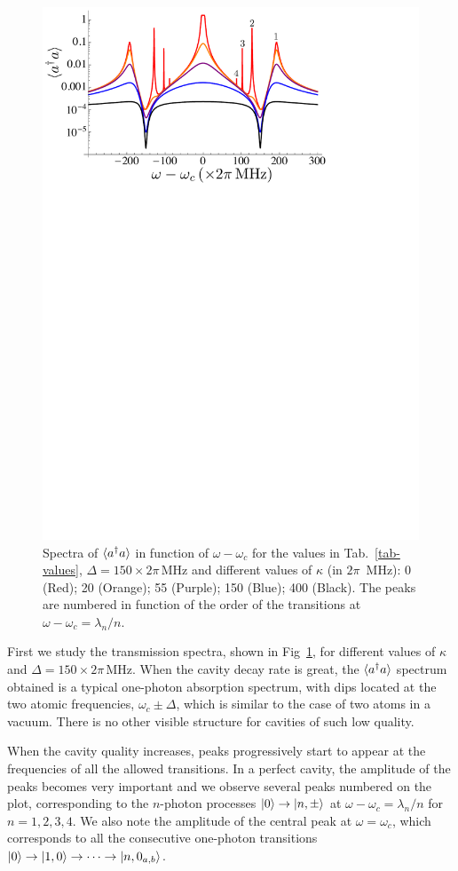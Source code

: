 \begin{figure}
\center
\includegraphics[width=0.75 \textwidth]{Images/chap5/aa_kappa.pdf}
\caption[ $\mean{a^\dagger a}$ in function of $\omega-\omega_c$]{ Spectra of $\mean{a^\dagger a}$ in function of $\omega-\omega_c$ for the values in Tab.~\ref{tab-values}, $\Delta=150 \times 2\pi\,\mbox{MHz}$ and different values of $\kappa$ (in $2\pi$~MHz): 0 (Red); 20 (Orange); 55 (Purple); 150 (Blue); 400 (Black). The peaks are numbered in function of the order of the transitions at $\omega-\omega_c=\lambda_n/n$.}
\label{fig-aa_kappa}
\end{figure}

First we study the transmission spectra, shown in Fig~\ref{fig-aa_kappa}, for different values of $\kappa$ and $\Delta=150 \times 2\pi\,\mbox{MHz}$. When the cavity decay rate is great, the $\mean{a^\dagger a}$ spectrum obtained is a typical one-photon absorption spectrum, with dips located at the two atomic frequencies, $\omega_c \pm \Delta$, which is similar to the case of two atoms in a vacuum. There is no other visible structure for cavities of such low quality. 

When the cavity quality increases, peaks progressively start to appear at the frequencies of all the allowed transitions. In a perfect cavity, the amplitude of the peaks becomes very important and we observe several peaks numbered on the plot, corresponding to the $n$-photon processes $| 0 \rangle \rightarrow | n,\pm \rangle$ at $\omega-\omega_c=\lambda_n/n$ for $n=1,2,3,4$. We also note the amplitude of the central peak at $\omega=\omega_c$, which corresponds to all the consecutive one-photon transitions $| 0 \rangle \rightarrow | 1,0 \rangle\rightarrow \cdots \rightarrow | n,0_{a,b} \rangle$.


